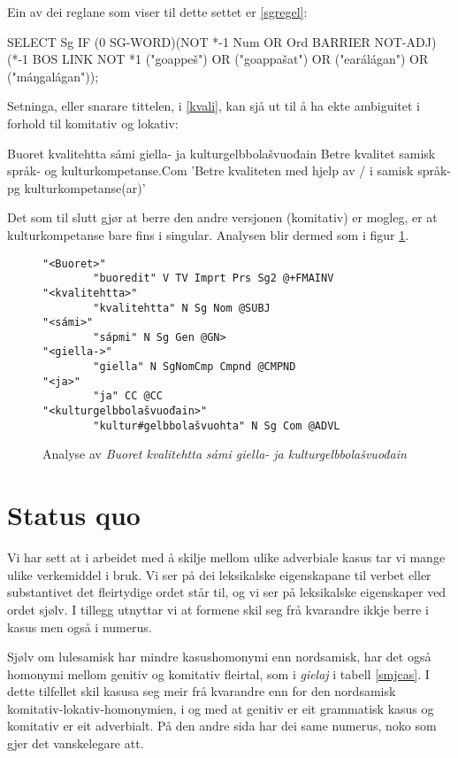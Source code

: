 \documentclass[a4paper,nynorsk]{article}
\begin{document}
Ein av dei reglane  som viser til dette settet er \ref{sgregel}: %

\begin{example}\label{sgregel}
SELECT Sg IF (0 SG-WORD)(NOT *-1 Num OR Ord BARRIER NOT-ADJ)(*-1 BOS LINK NOT *1 ("goappeš") OR ("goappašat") OR ("earálágan") OR ("máŋgalágan"));
\end{example}

Setninga, eller snarare tittelen, i \ref{kvali}, kan sjå ut til å ha ekte ambiguitet i forhold til komitativ og lokativ: %

\begin{example}\label{kvali}
\gll Buoret kvalitehtta sámi giella- ja kulturgelbbolašvuođain
      Betre kvalitet samisk språk- og kulturkompetanse.Com
\glt 'Betre kvaliteten med hjelp av / i samisk språk- pg kulturkompetanse(ar)'
\glend
\end{example}


Det som til slutt gjør at berre den andre versjonen (komitativ) er mogleg, er  at kulturkompetanse bare fins i singular. Analysen blir dermed som i figur \ref{kvalianalyse}.%


\begin{figure}[htbp]
\begin{center}
\begin{verbatim}
"<Buoret>"
        "buoredit" V TV Imprt Prs Sg2 @+FMAINV
"<kvalitehtta>"
        "kvalitehtta" N Sg Nom @SUBJ
"<sámi>"
        "sápmi" N Sg Gen @GN>
"<giella->"
        "giella" N SgNomCmp Cmpnd @CMPND
"<ja>"
        "ja" CC @CC
"<kulturgelbbolašvuođain>"
        "kultur#gelbbolašvuohta" N Sg Com @ADVL
\end{verbatim}
\caption{Analyse av \textit{Buoret kvalitehtta sámi giella- ja kulturgelbbolašvuođain}}
\label{kvalianalyse}
\end{center}
\end{figure}


\section{Status quo}

Vi har sett at i arbeidet med å skilje mellom ulike adverbiale kasus tar vi mange ulike verkemiddel i bruk. Vi ser på dei leksikalske eigenskapane til verbet eller substantivet det fleirtydige ordet står til, og vi ser på leksikalske eigenskaper ved ordet sjølv. I tillegg utnyttar vi at formene skil seg frå kvarandre ikkje berre i kasus men også i numerus. %

Sjølv om lulesamisk har mindre kasushomonymi enn nordsamisk, har det også homonymi mellom genitiv og komitativ fleirtal, som i \textit{gielaj} i tabell \ref{smjcas}. I dette tilfellet skil kasusa seg meir frå kvarandre enn for den nordsamisk komitativ-lokativ-homonymien, i og med at genitiv er eit grammatisk kasus og komitativ er eit adverbialt. På den andre sida har dei same numerus, noko som gjer det vanskelegare att. %
\end{document}
